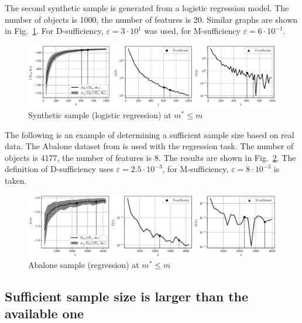\documentclass[
11pt,%
tightenlines,%
twoside,%
onecolumn,%
nofloats,%
nobibnotes,%
nofootinbib,%
superscriptaddress,%
noshowpacs,%
centertags]%
{revtex4-2}
\begin{document}
The second synthetic sample is generated from a logistic regression model. The number of objects is 1000, the number of features is 20. Similar graphs are shown in Fig.~\ref{synthetic-classification-sufficient}. For D-sufficiency, $\varepsilon = 3 \cdot 10^1$ was used, for M-sufficiency $\varepsilon = 6 \cdot 10^{-1}$.

\begin{figure}[h!]
    \centering
    \includegraphics[width=\textwidth]{../paper/figures/gray/eps/synthetic-classification-sufficient}
    \caption{Synthetic sample (logistic regression) at $m^* \leqslant m$}
    \label{synthetic-classification-sufficient}
\end{figure}

The following is an example of determining a sufficient sample size based on real data. The Abalone dataset from \citep{UCI} is used with the regression task. The number of objects is 4177, the number of features is 8. The results are shown in Fig.~\ref{abalone-sufficient}. The definition of D-sufficiency uses $\varepsilon=2.5 \cdot 10^{-3}$, for M-sufficiency, $\varepsilon=8 \cdot 10^{-3}$ is taken.

\begin{figure}[h!]
    \centering
    \includegraphics[width=\textwidth]{../paper/figures/gray/eps/abalone-sufficient}
    \caption{Abalone sample (regression) at $m^*\leqslant m$}
    \label{abalone-sufficient}
\end{figure}

\subsection{Sufficient sample size is larger than the available one}
\end{document}
